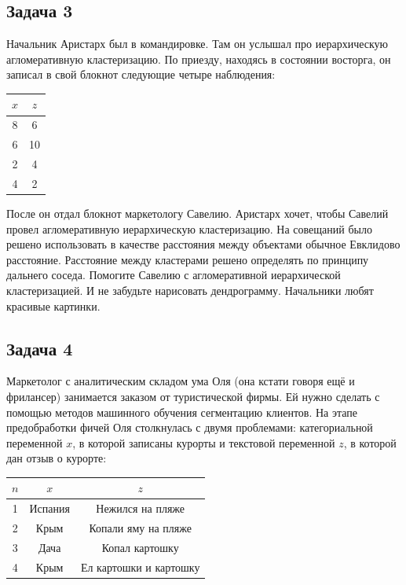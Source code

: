 \documentclass[12pt, a4paper, oneside]{article}
\begin{document}
\subsection*{Задача 3 }

Начальник Аристарх был в командировке. Там он услышал про иерархическую агломеративную кластеризацию. По приезду, находясь в состоянии восторга, он записал в свой блокнот следующие четыре наблюдения:

\begin{center}
\begin{tabular}{c|c}
	\hline
	$x$ & $z$ \\
	\hline
	8 & 6   \\
	6 & 10 \\
	2 & 4   \\
	4 & 2   \\
\end{tabular}
\end{center}

После он отдал блокнот маркетологу Савелию. Аристарх хочет, чтобы Савелий провел агломеративную иерархическую кластеризацию.  На совещаний было решено использовать в качестве расстояния между объектами обычное Евклидово расстояние. Расстояние между кластерами решено определять по принципу дальнего соседа. Помогите Савелию с агломеративной иерархической кластеризацией. И не забудьте нарисовать дендрограмму. Начальники любят красивые картинки. 

\subsection*{Задача 4} 

Маркетолог с аналитическим складом ума Оля (она кстати говоря ещё и фрилансер) занимается заказом от туристической фирмы. Ей нужно сделать с помощью методов машинного обучения сегментацию клиентов. На этапе предобработки фичей Оля столкнулась с двумя проблемами: категориальной переменной $x$, в которой записаны курорты и текстовой переменной $z$, в которой дан отзыв о курорте:

\begin{center}
	\begin{tabular}{c|c|c}
		\hline
		$n$ & $x$ & $z$ \\
		\hline
		1 & Испания  & Нежился на пляже  \\
		2 & Крым  &  Копали яму на пляже\\
		3 & Дача  &  Копал картошку  \\
		4 & Крым  & Ел картошки и картошку \\
	\end{tabular}
\end{center}
\end{document}
